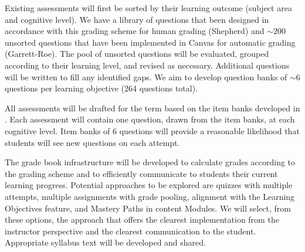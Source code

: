 \documentclass[10pt,letterpaper]{article}
\begin{document}

%
%

\label{ssa:question_bank} Existing assessments will first be sorted by their learning outcome (subject area and cognitive level). We have a library of  questions that been designed in accordance with this grading scheme for human grading (Shepherd) and $\sim200$ unsorted questions that have been implemented in Canvas for automatic grading (Garrett-Roe). The pool of unsorted questions will be evaluated, grouped according to their learning level, and revised as necessary. Additional questions will be written to fill any identified gaps. We aim to develop question banks of $\sim6$ questions per learning objective (264 questions total). 



All assessments will be drafted for the term based on the item banks developed in . Each assessment will contain one question, drawn from the item banks, at each cognitive level. Item banks of 6 questions will provide a reasonable likelihood that students will see new questions on each attempt.

The grade book infrastructure will be developed to calculate grades according to the grading scheme and to efficiently communicate to students their current learning progress. Potential approaches to be explored are quizzes with multiple attempts, multiple assignments with grade pooling, alignment with the Learning Objectives feature, and Mastery Paths in content Modules. We will select, from these options, the approach that offers the clearest implementation from the instructor perspective and the clearest communication to the student. Appropriate syllabus text will be developed and shared.
 
\end{document}
